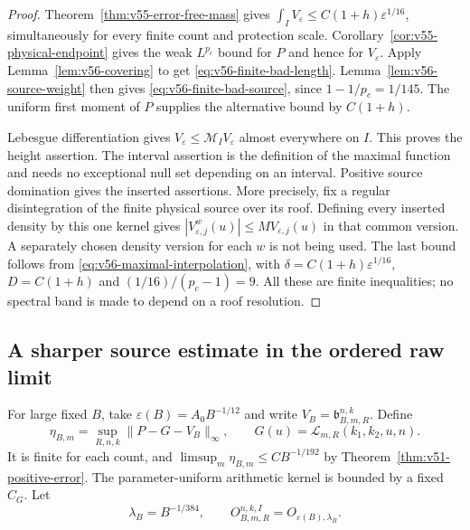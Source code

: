 \begin{proof}
Theorem~\ref{thm:v55-error-free-mass} gives
$\int_I V_\varepsilon\le C(1+h)\varepsilon^{1/16}$,
simultaneously for every finite count and protection scale.
Corollary~\ref{cor:v55-physical-endpoint} gives the weak $L^{p_c}$
bound for $P$ and hence for $V_\varepsilon$. Apply
Lemma~\ref{lem:v56-covering} to get
\eqref{eq:v56-finite-bad-length}. Lemma~\ref{lem:v56-source-weight}
then gives \eqref{eq:v56-finite-bad-source}, since
$1-1/p_c=1/145$. The uniform first moment of $P$ supplies the
alternative bound by $C(1+h)$.

Lebesgue differentiation gives
$V_\varepsilon\le\mathcal M_I V_\varepsilon$ almost everywhere
on $I$. This proves the height assertion. The interval assertion
is the definition of the maximal function and needs no exceptional
null set depending on an interval. Positive source domination gives
the inserted assertions. More precisely, fix a regular disintegration
of the finite physical source over its roof. Defining every inserted
density by this one kernel gives
$|V_{\varepsilon,j}^w(u)|\le M V_{\varepsilon,j}(u)$ in that
common version. A separately chosen density version for each $w$
is not being used. The last bound follows from
\eqref{eq:v56-maximal-interpolation}, with
$\delta=C(1+h)\varepsilon^{1/16}$, $D=C(1+h)$ and
$(1/16)/(p_c-1)=9$. All these are finite inequalities; no spectral
band is made to depend on a roof resolution.
\end{proof}

\subsection{A sharper source estimate in the ordered raw limit}
For large fixed $B$, take $\varepsilon(B)=A_0B^{-1/12}$ and write
$V_B=\mathfrak b_{B,m,R}^{n,k}$. Define
\[
 \eta_{B,m}=\sup_{R,n,k}\|P-G-V_B\|_\infty,
 \qquad G(u)=\mathcal L_{m,R}(k_1,k_2,u,n).
\]
It is finite for each count, and
$\limsup_m\eta_{B,m}\le CB^{-1/192}$ by
Theorem~\ref{thm:v51-positive-error}. The parameter-uniform
arithmetic kernel is bounded by a fixed $C_G$. Let
\begin{equation}\label{eq:v56-band-threshold}
 \lambda_B=B^{-1/384},\qquad
 O_{B,m,R}^{n,k,I}=O_{\varepsilon(B),\lambda_B}.
\end{equation}

